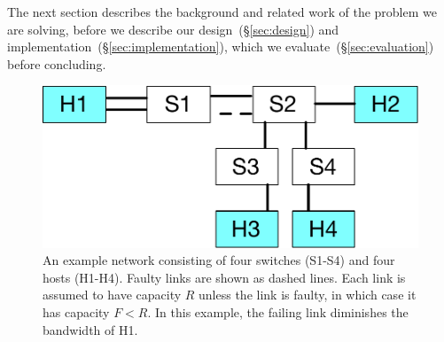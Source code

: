 The next section describes the background and related work of the problem we
are solving, before we describe our design~(\S\ref{sec:design}) and
implementation~(\S\ref{sec:implementation}), which we
evaluate~(\S\ref{sec:evaluation}) before concluding.

\begin{figure}
  \centering
  \includegraphics[width=0.3\paperwidth]{example_network.pdf}
  \caption{\label{fig:example-net}An example network consisting of four
    switches (S1-S4) and four hosts (H1-H4). Faulty links are shown as dashed lines.
    Each link is assumed to have capacity $R$ unless the link is faulty, in
    which case it has capacity $F < R$.  In this example, the failing link
    diminishes the bandwidth of H1.}
\end{figure}
